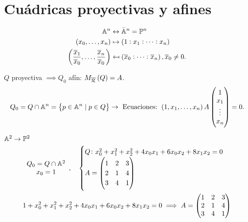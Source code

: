 

\section{Cuádricas proyectivas y afines}

\begin{align*}
    \mathbb{A}^n &\leftrightarrow \bar{\mathbb{A}}^n = \mathbb{P}^n \\
    \left( x_0, \dots, x_n \right) &\mapsto \left( 1:x_1:\dots:x_n \right) \\
    \left( \frac{\overline{x}_1}{\overline{x}_0}, \dots, \frac{\overline{x}_n}{\overline{x}_0} \right) &\mapsfrom \left( \overline{x}_0:\dots:\overline{x}_n \right), \overline{x}_0 \neq 0.
\end{align*}
\begin{obs}
    $Q$ proyectiva $\implies Q_0$ afín: $M_{\overline{\mathcal{R}}}\left( Q \right) = A$.
    \[ Q_0 = Q\cap \mathbb{A}^n = \left\{ p \in \mathbb{A}^n \;|\; p\in Q \right\} \to \text{ Ecuaciones: } \left( 1,x_1,\dots,x_n \right)A
       \begin{pmatrix}
            1 \\
            x_1 \\
            \vdots \\
            x_n
        \end{pmatrix} = 0.
    \]
\end{obs}
\begin{example}
    $\mathbb{A}^2 \to \mathbb{P}^2$ \\
    \begin{gather*}
        \begin{array}{c}
            Q_0 = Q\cap \mathbb{A}^2 \\
            x_0 = 1
        \end{array}, \quad
        \begin{cases}
            Q \colon x_0^2 + x_1^2 + x_2^2 + 4x_0x_1 + 6x_0x_2 + 8x_1x_2 = 0 \\
            A = 
            \begin{pmatrix}
                1 & 2 & 3 \\
                2 & 1 & 4 \\
                3 & 4 & 1
            \end{pmatrix}
        \end{cases} \\
        1 + x_0^2 + x_1^2 + x_2^2 + 4x_0x_1 + 6x_0x_2 + 8x_1x_2 = 0 \implies A = 
        \begin{pmatrix}
            1 & 2 & 3 \\
            2 & 1 & 4 \\
            3 & 4 & 1
        \end{pmatrix}
    \end{gather*}
\end{example}
